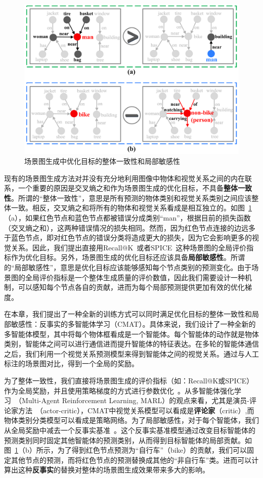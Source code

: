 \begin{figure}[htbp]
    \centering
    \includegraphics[width=0.8\linewidth]{chapter4/res/motivation.pdf}
    \caption{场景图生成中优化目标的整体一致性和局部敏感性}
    \label{ch4:fig:motivation}
\end{figure}


现有的场景图生成方法对并没有充分地利用图像中物体和视觉关系之间的内在联系，一个重要的原因是交叉熵之和作为场景图生成的优化目标，不具备\textbf{整体一致性}。所谓的“整体一致性”，意思是所有预测的物体类别和视觉关系类别之间应该整体一致。相反，交叉熵之和将所有的物体和视觉关系看成是相互独立的。如图~\ref{ch4:fig:motivation}（a），如果红色节点和蓝色节点都被错误分成类别“man”，根据目前的损失函数（交叉熵之和），这两种错误情况的损失相同。然而，因为红色节点连接的边远多于蓝色节点，即对红色节点的错误分类将造成更大的损失，因为它会影响更多的视觉关系。因此，我们提出直接用Recall@K~\cite{lu2016visual}或者SPICE~\cite{anderson2016spice}这种场景图的全局评价指标作为优化目标。另外，场景图生成的优化目标还应该具备\textbf{局部敏感性}。所谓的“局部敏感性”，意思是优化目标应该能够感知每个节点类别的预测变化。由于场景图的全局评价指标是一个整体生成质量的评价数值，因此我们需要设计一种机制，可以感知每个节点各自的贡献，进而为每个局部预测提供更加有效的优化梯度。


在本章，我们提出了一种全新的训练方式可以同时满足优化目标的整体一致性和局部敏感性：反事实的多智能体学习（CMAT）。具体来说，我们设计了一种全新的多智能体模型，其中将每个物体框看成是一个智能体。每个智能体的动作就是物体类别，智能体之间可以进行通信进而提升智能体的特征表达。在多轮的智能体通信之后，我们利用一个视觉关系预测模型来得到智能体之间的视觉关系。通过与人工标注的场景图对比，得到一个全局的奖励。

为了整体一致性，我们直接将场景图生成的评价指标（如：Recall@K或SPICE）作为全局奖励，并且使用策略梯度的方式进行参数优化~\cite{sutton2000policy}。从多智能体强化学习~\cite{tampuu2017multiagent,lowe2017multi}（Multi-Agent Reinforcement Learning, MARL）的观点来看，尤其是演员-评论家方法~\cite{lowe2017multi}（actor-critic），CMAT中视觉关系模型可以看成是\textbf{评论家}（critic）,而物体类别分类模型可以看成是策略网络。为了局部敏感性，对于每个智能体，我们从全局奖励中减去一个反事实基准~\cite{foerster2018counterfactual}。这个反事实基准模型通过改变目标智能体的预测类别同时固定其他智能体的预测类别，从而得到目标智能体的局部贡献。如图~\ref{ch4:fig:motivation}（b）所示，为了得到红色节点预测为“自行车”（bike）的贡献，我们可以固定其他节点的预测，而将红色节点的预测替换成其他的“非自行车”类。进而可以计算出这种\textbf{反事实}的替换对整体的场景图生成效果带来多大的影响。

